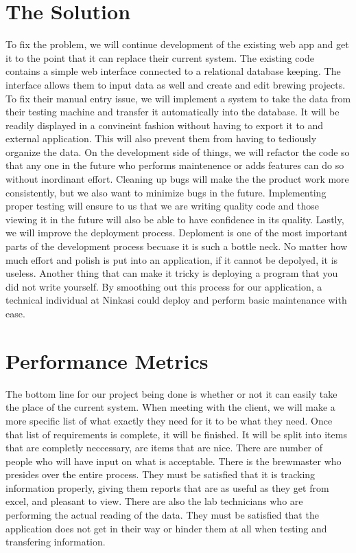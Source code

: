 \documentclass[draftclsnofoot,onecolumn,10pt]{IEEEtran}
\begin{document}
	\section*{The Solution}
		To fix the problem, we will continue development of the existing web app and get it to the point that it can replace their current system. The existing code contains a simple web interface connected to a relational database keeping. The interface allows them to input data as well and create and edit brewing projects. To fix their manual entry issue, we will implement a system to take the data from their testing machine and transfer it automatically into the database. It will be readily displayed in a convineint fashion without having to export it to and external application. This will also prevent them from having to tediously organize the data. On the development side of things, we will refactor the code so that any one in the future who performs maintenence or adds features can do so without inordinant effort. Cleaning up bugs will make the the product work more consistently, but we also want to minimize bugs in the future. Implementing proper testing will ensure to us that we are writing quality code and those viewing it in the future will also be able to have confidence in its quality. Lastly, we will improve the deployment process. Deploment is one of the most important parts of the development process becuase it is such a bottle neck. No matter how much effort and polish is put into an application, if it cannot be depolyed, it is useless. Another thing that can make it tricky is deploying a program that you did not write yourself. By smoothing out this process for our application, a technical individual at Ninkasi could deploy and perform basic maintenance with ease.
	\section*{Performance Metrics}
		The bottom line for our project being done is whether or not it can easily take the place of the current system. When meeting with the client, we will make a more specific list of what exactly they need for it to be what they need. Once that list of requirements is complete, it will be finished. It will be split into items that are completly neccessary, are items that are nice. There are number of people who will have input on what is acceptable. There is the brewmaster who presides over the entire process. They must be satisfied that it is tracking information properly, giving them reports that are as useful as they get from excel, and pleasant to view. There are also the lab technicians who are performing the actual reading of the data. They must be satisfied that the application does not get in their way or hinder them at all when testing and transfering information.
\end{document}

